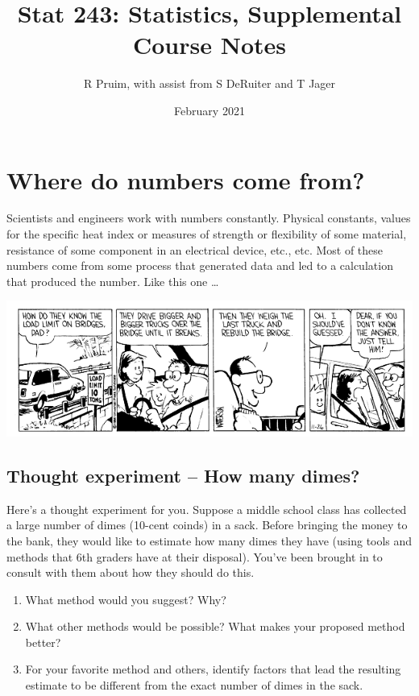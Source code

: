 \documentclass[twoside]{book}\usepackage[]{graphicx}\usepackage[]{xcolor}
\title{Stat 243: Statistics, Supplemental Course Notes}
\author{R Pruim, with assist from S DeRuiter and T Jager}
\date{February 2021}
\def\Chapter#1{%
\chapter{#1}
}
\begin{document}
\maketitle
\setcounter{tocdepth}{1}
\tableofcontents





\setcounter{chapter}{-1}

\Chapter{Where do numbers come from?}

Scientists and engineers work with numbers constantly.  Physical constants, values for 
the specific heat index or measures of strength or flexibility of some material, 
resistance of some component in an electrical device, etc., etc.
Most of these numbers come from some process that generated data and led to a calculation
that produced the number.  Like this one \dots
 
\begin{center}
	\includegraphics[width = .8\textwidth]{images/CalvinBridgeLoad2.png}
\end{center}


\section*{Thought experiment -- How many dimes?}
Here's a thought experiment for you.  Suppose a middle school class has collected a 
large number of dimes (10-cent coinds) in a sack.  Before bringing the money to the bank, they would like
to estimate how many dimes they have (using tools and methods that 6th graders have at
their disposal).  You've been brought in to consult with them about how they should do this.
\begin{enumerate}
	\item
What method would you suggest?  Why?
\item
What other methods would be possible?  What makes your proposed method better?
\item
For your favorite method and others, identify factors that lead the resulting estimate
to be different from the exact number of dimes in the sack.  
\end{enumerate}
\end{document}

